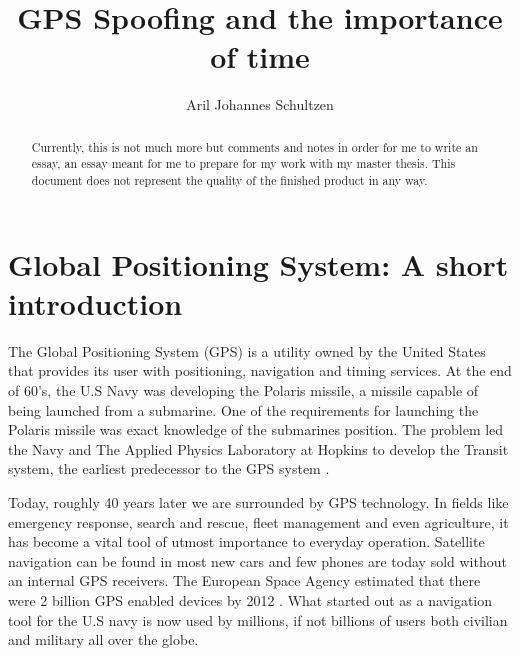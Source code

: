 \documentclass[12pt,english,a4paper]{article}
\title{GPS Spoofing and the importance of time}
\author{Aril Johannes Schultzen}
\begin{document}
\maketitle
\thispagestyle{empty}
\setcounter{page}{0}
\newpage
\tableofcontents
\thispagestyle{empty}
\setcounter{page}{0}
\newpage
\thispagestyle{empty}
\setcounter{page}{0}

\begin{abstract}
Currently, this is not much more but comments and notes in order for me to write an essay, an essay meant for me to prepare for my work with my master thesis. This document does not represent the quality of the finished product in any way.
\end{abstract}

\newpage
\clearpage
\setcounter{page}{1}

\section{Global Positioning System: A short introduction}
The Global Positioning System (GPS) is a utility owned by the United States that provides its user with positioning, navigation and timing services. At the end of 60's, the U.S Navy was developing the Polaris missile, a missile capable of being launched from a submarine. One of the requirements for launching the Polaris missile was exact knowledge of the submarines position. The problem led the Navy and The Applied Physics Laboratory at Hopkins to develop the Transit system, the earliest predecessor to the GPS system \cite{SteJ}. 

Today, roughly 40 years later we are surrounded by GPS technology. In fields like emergency response, search and rescue, fleet management and even agriculture, it has become a vital tool of utmost importance to everyday operation. Satellite navigation can be found in most new cars and few phones are today sold without an internal GPS receivers. The European Space Agency estimated that there were 2 billion GPS enabled devices by 2012 \cite{ESA}. What started out as a navigation tool for the U.S navy is now used by millions, if not billions of users both civilian and military all over the globe.
\end{document}
